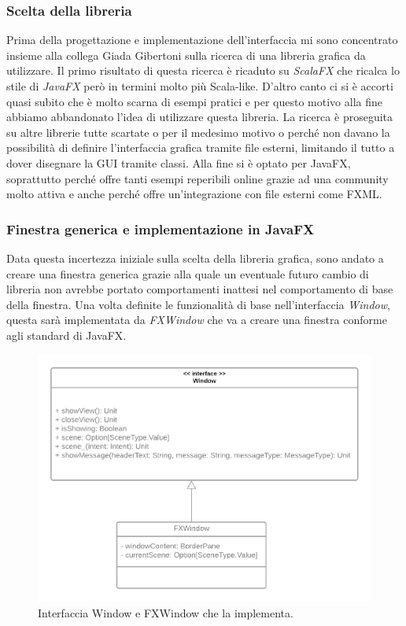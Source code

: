 \subsubsection{Scelta della libreria}

Prima della progettazione e implementazione dell'interfaccia mi sono concentrato insieme alla collega Giada Gibertoni sulla ricerca di una libreria grafica da utilizzare.
Il primo risultato di questa ricerca è ricaduto su \textit{ScalaFX} che ricalca lo stile di \textit{JavaFX} però in termini molto più Scala-like.
D'altro canto ci si è accorti quasi subito che è molto scarna di esempi pratici e per questo motivo alla fine abbiamo abbandonato l'idea di utilizzare questa libreria.
La ricerca è proseguita su altre librerie tutte scartate o per il medesimo motivo o perché non davano la possibilità di definire l'interfaccia grafica tramite file esterni, limitando il tutto a dover disegnare la GUI tramite classi.
Alla fine si è optato per JavaFX, soprattutto perché offre tanti esempi reperibili online grazie ad una community molto attiva e anche perché offre un'integrazione con file esterni come FXML.

\subsubsection{Finestra generica e implementazione in JavaFX}

Data questa incertezza iniziale sulla scelta della libreria grafica, sono andato a creare una finestra generica grazie alla quale un eventuale futuro cambio di libreria non avrebbe portato comportamenti inattesi nel comportamento di base della finestra.
Una volta definite le funzionalità di base nell'interfaccia \textit{Window}, questa sarà implementata da \textit{FXWindow} che va a creare una finestra conforme agli standard di JavaFX.

\begin{figure}[H]
  \includegraphics[width=15cm]{res/6-implementazione/chiana/UML_Window.png}
  \caption{Interfaccia Window e FXWindow che la implementa.}
  \label{windowClass}
\end{figure}

